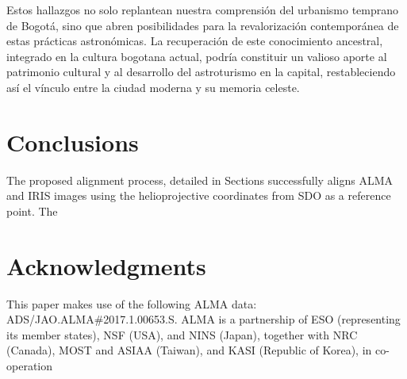 \documentclass[a4paper,alpha-refs]{eSpectra}
\begin{document}
Estos hallazgos no solo replantean nuestra comprensión del urbanismo temprano de Bogotá, sino que abren posibilidades para la revalorización contemporánea de estas prácticas astronómicas. La recuperación de este conocimiento ancestral, integrado en la cultura bogotana actual, podría constituir un valioso aporte al patrimonio cultural y al desarrollo del astroturismo en la capital, restableciendo así el vínculo entre la ciudad moderna y su memoria celeste.

\section{Conclusions}
The proposed alignment process, detailed in   Sections
successfully aligns ALMA and IRIS images using the helioprojective coordinates from SDO as a reference point. The 


\section*{Acknowledgments}
This paper makes use of the following ALMA data: ADS/JAO.ALMA\#2017.1.00653.S. ALMA is a partnership of ESO (representing its member states), NSF (USA), and NINS (Japan), together with NRC (Canada), MOST and ASIAA (Taiwan), and KASI (Republic of Korea), in co-operation 





\end{document}
